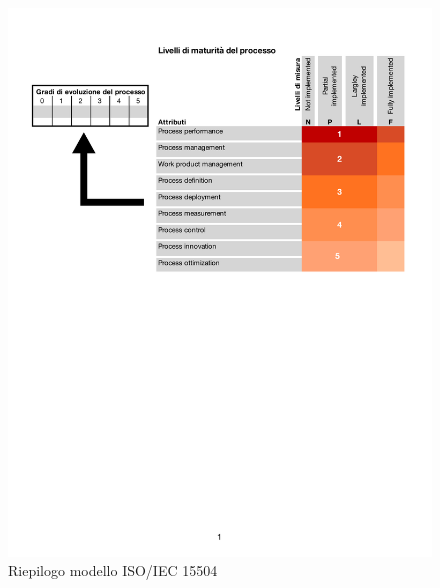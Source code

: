 \begin{figure}[htbp]
	\centering
	\includegraphics[scale=0.7]{images/ISOIEC15504.pdf}
	\caption{Riepilogo modello ISO/IEC 15504}
\end{figure}
\newpage


